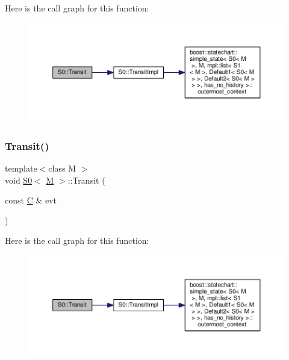Here is the call graph for this function\+:
\nopagebreak
\begin{figure}[H]
\begin{center}
\leavevmode
\includegraphics[width=350pt]{struct_s0_a6e678f49b914efe49fb001bd7ed8e950_cgraph}
\end{center}
\end{figure}
\mbox{\label{struct_s0_a013a8c49c337102e97536f2475579d87}} 
\subsubsection{\texorpdfstring{Transit()}{Transit()}\hspace{0.1cm}{\footnotesize\ttfamily [3/7]}}
{\footnotesize\ttfamily template$<$class M $>$ \\
void \mbox{\hyperlink{struct_s0}{S0}}$<$ \mbox{\hyperlink{struct_m}{M}} $>$\+::Transit (\begin{DoxyParamCaption}\item[{const \mbox{\hyperlink{struct_c}{C}} \&}]{evt }\end{DoxyParamCaption})\hspace{0.3cm}{\ttfamily [inline]}}

Here is the call graph for this function\+:
\nopagebreak
\begin{figure}[H]
\begin{center}
\leavevmode
\includegraphics[width=350pt]{struct_s0_a013a8c49c337102e97536f2475579d87_cgraph}
\end{center}
\end{figure}
\mbox{\label{struct_s0_a4fd4a4f8f2d4eed1d293bf74d09e145c}} 
